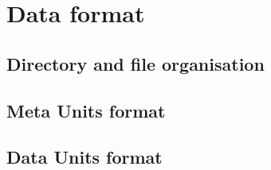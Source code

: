 \documentclass{article}
\begin{document}
 \section{Data format}
 \subsection{Directory and file organisation}
  

  
 \subsection{Meta Units format}
  

  
 \subsection{Data Units format}
  

  
\end{document}
